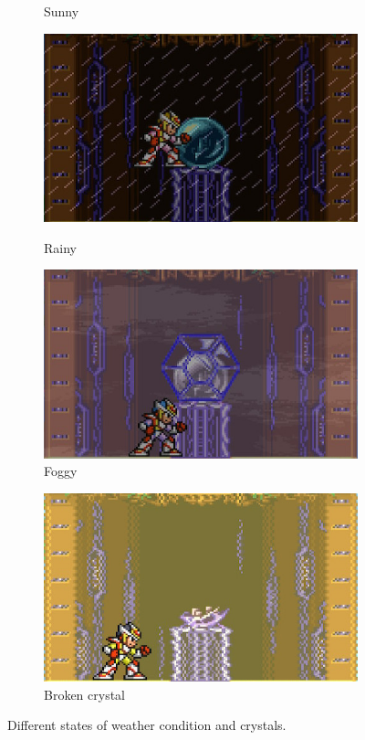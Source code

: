 \begin{figure}[htp]
\begin{subfigure}{0.3\linewidth}
		\caption{Sunny}
			\end{subfigure}
	\begin{subfigure}{0.3\linewidth}	
		\centering
		\includegraphics[width=\linewidth]{figures/X2/Wire_sponge/sponge_crystal_rain.jpg}\\
		\caption{Rainy}
	\end{subfigure}
	\begin{subfigure}{0.3\linewidth}
		\centering
		\includegraphics[width=\linewidth]{figures/X2/Wire_sponge/sponge_crystal_fog.jpg}
		\caption{Foggy}	
	\end{subfigure}
	\begin{subfigure}{0.3\linewidth}
		\centering
		\includegraphics[width=\linewidth]{figures/X2/Wire_sponge/sponge_crystal_broken.jpg}
		\caption{Broken crystal}	
	\end{subfigure}
	\caption{Different states of weather condition and crystals.}
\end{figure}
